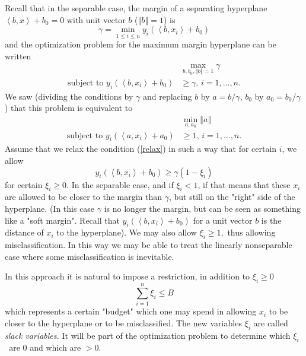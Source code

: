 \documentclass[11pt,twoside]{article}%
\theoremstyle{change}
\begin{document}
Recall that in the separable case, the margin of a separating hyperplane
$\left\langle b,x\right\rangle +b_{0}=0$ with unit vector $b$ ($\left\Vert
b\right\Vert =1$) is
\[
\gamma=\min_{1\leq i\leq n}y_{i}\left(  \left\langle b,x_{i}\right\rangle
+b_{0}\right)
\]
and the optimization problem for the maximum margin hyperplane can be written
\begin{align}
& \max_{b,b_{0},\left\Vert b\right\Vert =1}\gamma\text{ }\nonumber\\
\text{subject to }y_{i}\left(  \left\langle b,x_{i}\right\rangle
+b_{0}\right)   & \geq\gamma\text{, }i=1,\ldots,n.\label{relax}%
\end{align}
We saw (dividing the conditions by $\gamma$ and replacing $b$ by $a=b/\gamma$,
$b_{0}$ by $a_{0}=b_{0}/\gamma$) that this problem is equivalent to
\begin{align*}
& \min_{a,a_{0}}\left\Vert a\right\Vert \text{ }\\
\text{subject to }y_{i}\left(  \left\langle a,x_{i}\right\rangle
+a_{0}\right)   & \geq1\text{, }i=1,\ldots,n.
\end{align*}
Assume that we relax the condition (\ref{relax}) in such a way that for
certain $i$, we allow $_{{}}$%
\[
y_{i}\left(  \left\langle b,x_{i}\right\rangle +b_{0}\right)  \geq\gamma
(1-\xi_{i})
\]
for certain $\xi_{i}\geq0$. In the separable case, and if $\xi_{i}<1$, if that
means that these $x_{i}$ are allowed to be closer to the margin than $\gamma$,
but still on the "right" side of the hyperplane. (In this case $\gamma$ is no
longer the margin, but can be seen as something like a "soft margin". Recall
that $y_{i}\left(  \left\langle b,x_{i}\right\rangle +b_{0}\right)  $ for a
unit vector $b$ is the distance of $x_{i}$ to the hyperplane). We may also
allow $\xi_{i}\geq1,$ thus allowing misclassification. In this way we may be
able to treat the linearly nonseparable case where some misclassification is inevitable.

In this approach it is natural to impose a restriction, in addition to
$\xi_{i}\geq0$
\begin{equation}
\sum_{i=1}^{n}\xi_{i}\leq B\label{budget}%
\end{equation}
which represents a certain "budget" which one may spend in allowing $x_{i}$ to
be closer to the hyperplane or to be misclassified. The new variables $\xi
_{i}$ are called \textit{slack variables. }It will be part of the optimization
problem to determine which $\xi_{i}$\textit{\ }are $0$ and which are $>0$.
\end{document}
